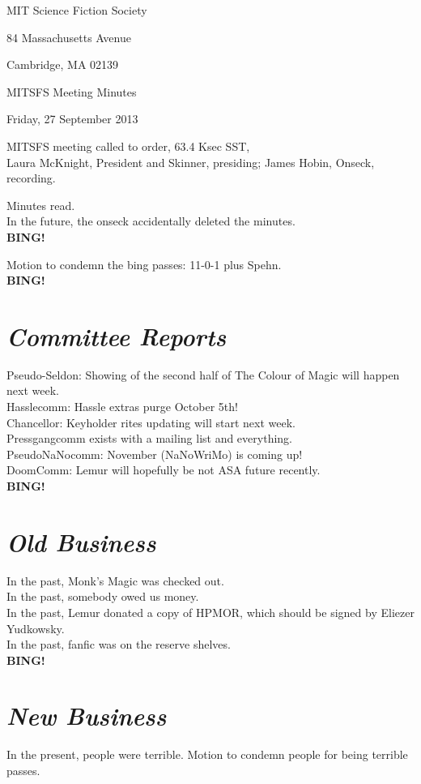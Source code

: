 \documentclass[10pt]{article}
\newcommand{\bing}{{\bf BING!} }
\newcommand{\goto}[1]{\bing \vskip 12pt \section*{{\em{#1}}}}
\newcommand{\skinner}{Laura McKnight, President and Skinner}
\newcommand{\onseck}{James Hobin, Onseck}
\newcommand{\meetingdate}{Friday, 27 September 2013}
\begin{document}
\begin{center}

MIT Science Fiction Society

84 Massachusetts Avenue

Cambridge, MA 02139

\vspace{12pt}

MITSFS Meeting Minutes

\meetingdate

\end{center}

\vspace{18pt}

\setlength{\parskip}{6pt}

\noindent
MITSFS meeting called to order, 63.4 Ksec SST, \\
\skinner, presiding; \onseck, recording.

Minutes read. \\

In the future, the onseck accidentally deleted the minutes. \\

\bing

Motion to condemn the bing passes: 11-0-1 plus Spehn. \\

\goto{Committee Reports}
Pseudo-Seldon: Showing of the second half of The Colour of Magic will happen next week. \\
Hasslecomm: Hassle extras purge October 5th! \\
Chancellor: Keyholder rites updating will start next week. \\
Pressgangcomm exists with a mailing list and everything. \\
PseudoNaNocomm: November (NaNoWriMo) is coming up! \\
DoomComm: Lemur will hopefully be not ASA future recently. \\

\goto{Old Business}
In the past, Monk's Magic was checked out. \\
In the past, somebody owed us money. \\
In the past, Lemur donated a copy of HPMOR, which should be signed by Eliezer Yudkowsky. \\
In the past, fanfic was on the reserve shelves. \\

\goto{New Business}
In the present, people were terrible. Motion to condemn people for being terrible passes. \\
\end{document}
